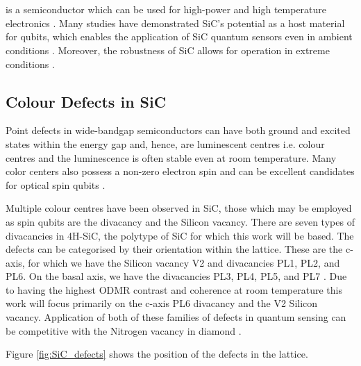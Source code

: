 \section{}\label{SiC}

 is a semiconductor which can be used for high-power and high temperature electronics \cite{Eddy2009,CASADY19961409}. Many studies have demonstrated SiC's potential as a host material for qubits, which enables the application of SiC quantum sensors even in ambient conditions \cite{PhysRevApplied.6.034001}. Moreover, 
the robustness of SiC allows for operation in extreme conditions
\cite{Cochrane2016}
.

\subsection{Colour Defects in SiC}
Point defects in wide-bandgap semiconductors can have both ground and excited states within the energy gap and, hence, are luminescent centres i.e. colour centres and the luminescence is often stable even at room temperature. 
Many color centers also possess a non-zero electron spin and can be excellent candidates for optical spin qubits \cite{Son2021}.

Multiple colour centres have been observed in SiC, those which may be employed as spin qubits are the divacancy and the Silicon vacancy. 
There are seven types of divacancies in 4H-SiC, the polytype of SiC for which this work will be based. 
The defects can be categorised by their orientation within the lattice. 
These are the c-axis, for which we have the Silicon vacancy V2 and divacancies PL1, PL2, and PL6. 
On the basal axis, we have the divacancies PL3, PL4, PL5, and PL7 \cite{Qin-Yue}. Due to having the highest ODMR contrast 
and coherence at room temperature this work will focus primarily on the c-axis PL6 divacancy and the V2 Silicon vacancy. 
Application of both of these families of defects in quantum sensing can be competitive with the Nitrogen vacancy in diamond \cite{10.1093/nsr/nwab122}.

Figure \ref{fig:SiC_defects} shows the position of the defects in the lattice. 

